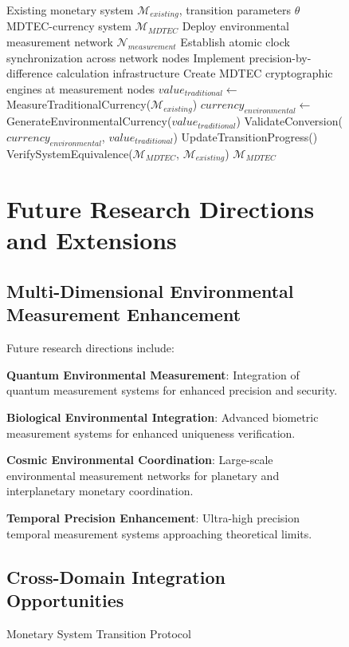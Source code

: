 \documentclass[12pt,a4paper]{article}
\begin{document}
\begin{figure}[H]
\begin{algorithm}
\caption{Monetary System Transition Protocol}
\begin{algorithmic}[1]
\Require Existing monetary system $\mathcal{M}_{existing}$, transition parameters $\theta$
\Ensure MDTEC-currency system $\mathcal{M}_{MDTEC}$
\State Deploy environmental measurement network $\mathcal{N}_{measurement}$
\State Establish atomic clock synchronization across network nodes
\State Implement precision-by-difference calculation infrastructure
\State Create MDTEC cryptographic engines at measurement nodes
    \State $value_{traditional} \leftarrow$ MeasureTraditionalCurrency($\mathcal{M}_{existing}$)
    \State $currency_{environmental} \leftarrow$ GenerateEnvironmentalCurrency($value_{traditional}$)
    \State ValidateConversion($currency_{environmental}$, $value_{traditional}$)
    \State UpdateTransitionProgress()
\EndWhile
\State VerifySystemEquivalence($\mathcal{M}_{MDTEC}$, $\mathcal{M}_{existing}$)
\Return $\mathcal{M}_{MDTEC}$
\end{algorithmic}
\end{algorithm}

\section{Future Research Directions and Extensions}

\subsection{Multi-Dimensional Environmental Measurement Enhancement}

Future research directions include:

\textbf{Quantum Environmental Measurement}: Integration of quantum measurement systems for enhanced precision and security.

\textbf{Biological Environmental Integration}: Advanced biometric measurement systems for enhanced uniqueness verification.

\textbf{Cosmic Environmental Coordination}: Large-scale environmental measurement networks for planetary and interplanetary monetary coordination.

\textbf{Temporal Precision Enhancement}: Ultra-high precision temporal measurement systems approaching theoretical limits.

\subsection{Cross-Domain Integration Opportunities}


\end{figure}
\end{document}
